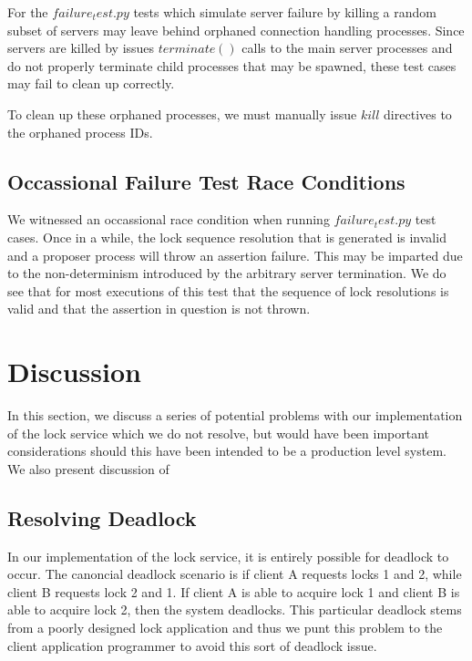\documentclass{article}
\begin{document}
For the $failure_test.py$ tests which simulate server failure by killing a random subset of servers may leave behind orphaned connection handling processes. 
Since servers are killed by issues $terminate()$ calls to the main server processes and do not properly terminate child processes that may be spawned, these test cases may fail to clean up correctly.

To clean up these orphaned processes, we must manually issue $kill$ directives to the orphaned process IDs.

\subsection{Occassional Failure Test Race Conditions}

We witnessed an occassional race condition when running $failure_test.py$ test cases.
Once in a while, the lock sequence resolution that is generated is invalid and a proposer process will throw an assertion failure.
This may be imparted due to the non-determinism introduced by the arbitrary server termination.
We do see that for most executions of this test that the sequence of lock resolutions is valid and that the assertion in question is not thrown.


\section{Discussion}

In this section, we discuss a series of potential problems with our implementation of the lock service which we do not resolve, but would have been important considerations should this have been intended to be a production level system.
We also present discussion of

\subsection{Resolving Deadlock}

In our implementation of the lock service, it is entirely possible for deadlock to occur.
The canoncial deadlock scenario is if client A requests locks 1 and 2, while client B requests lock 2 and 1.
If client A is able to acquire lock 1 and client B is able to acquire lock 2, then the system deadlocks.
This particular deadlock stems from a poorly designed lock application and thus we punt this problem to the client application programmer to avoid this sort of deadlock issue.
\end{document}
